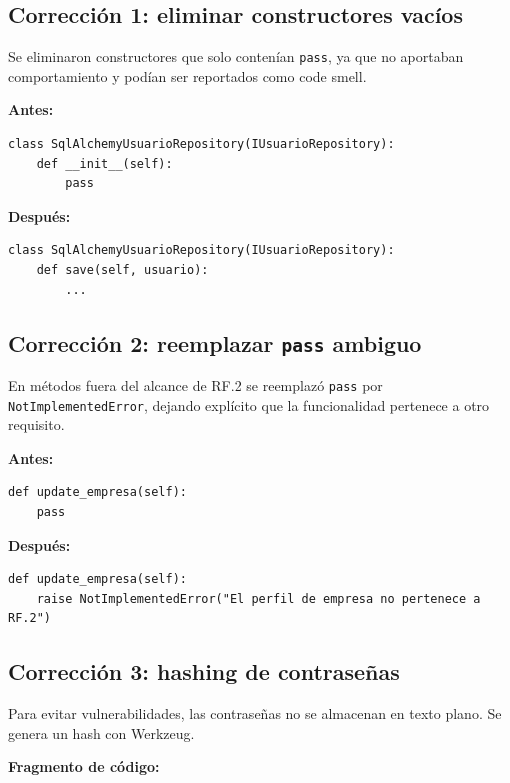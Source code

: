 \documentclass[12pt,a4paper]{article}
\begin{document}
\subsection{Corrección 1: eliminar constructores vacíos}

Se eliminaron constructores que solo contenían \texttt{pass}, ya que no aportaban comportamiento y podían ser reportados como code smell.

\textbf{Antes:}

\begin{lstlisting}[style=pythonstyle]
class SqlAlchemyUsuarioRepository(IUsuarioRepository):
    def __init__(self):
        pass
\end{lstlisting}

\textbf{Después:}

\begin{lstlisting}[style=pythonstyle]
class SqlAlchemyUsuarioRepository(IUsuarioRepository):
    def save(self, usuario):
        ...
\end{lstlisting}

\subsection{Corrección 2: reemplazar \texttt{pass} ambiguo}

En métodos fuera del alcance de RF.2 se reemplazó \texttt{pass} por \texttt{NotImplementedError}, dejando explícito que la funcionalidad pertenece a otro requisito.

\textbf{Antes:}

\begin{lstlisting}[style=pythonstyle]
def update_empresa(self):
    pass
\end{lstlisting}

\textbf{Después:}

\begin{lstlisting}[style=pythonstyle]
def update_empresa(self):
    raise NotImplementedError("El perfil de empresa no pertenece a RF.2")
\end{lstlisting}

\subsection{Corrección 3: hashing de contraseñas}

Para evitar vulnerabilidades, las contraseñas no se almacenan en texto plano. Se genera un hash con Werkzeug.

\textbf{Fragmento de código:}
\end{document}
